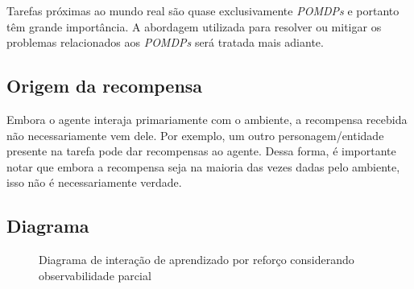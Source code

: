 \documentclass{article}
\begin{document}
            Tarefas próximas ao mundo real são quase exclusivamente \emph{POMDPs} e portanto têm grande importância. A abordagem utilizada para resolver ou mitigar os problemas relacionados aos \emph{POMDPs} será tratada mais adiante.

        \subsection{Origem da recompensa}
        
            Embora o agente interaja primariamente com o ambiente, a recompensa recebida não necessariamente vem dele. Por exemplo, um outro personagem/entidade presente na tarefa pode dar recompensas ao agente. Dessa forma, é importante notar que embora a recompensa seja na maioria das vezes dadas pelo ambiente, isso não é necessariamente verdade.

        \subsection{Diagrama}

            \begin{figure}[ht]
                \centering
                \rlinteractionpomdp
                \caption{Diagrama de interação de aprendizado por reforço considerando observabilidade parcial}
                \label{diag:po-rl}
            \end{figure}
\end{document}
